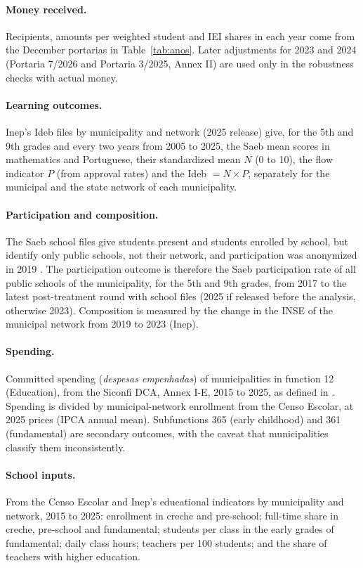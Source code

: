 \documentclass[11pt]{article}
\begin{document}
\paragraph{Money received.} Recipients, amounts per weighted student and IEI shares in each year come from the December portarias in Table~\ref{tab:anos}. Later adjustments for 2023 and 2024 (Portaria 7/2026 and Portaria 3/2025, Annex II) are used only in the robustness checks with actual money.

\paragraph{Learning outcomes.} Inep's Ideb files by municipality and network (2025 release) give, for the 5th and 9th grades and every two years from 2005 to 2025, the Saeb mean scores in mathematics and Portuguese, their standardized mean $N$ (0 to 10), the flow indicator $P$ (from approval rates) and the Ideb $= N \times P$, separately for the municipal and the state network of each municipality.

\paragraph{Participation and composition.} The Saeb school files give students present and students enrolled by school, but identify only public schools, not their network, and participation was anonymized in 2019 \citep{lima2025ideb}. The participation outcome is therefore the Saeb participation rate of all public schools of the municipality, for the 5th and 9th grades, from 2017 to the latest post-treatment round with school files (2025 if released before the analysis, otherwise 2023). Composition is measured by the change in the INSE of the municipal network from 2019 to 2023 (Inep).

\paragraph{Spending.} Committed spending (\textit{despesas empenhadas}) of municipalities in function 12 (Education), from the Siconfi DCA, Annex I-E, 2015 to 2025, as defined in \citet{cunha2026a}. Spending is divided by municipal-network enrollment from the Censo Escolar, at 2025 prices (IPCA annual mean). Subfunctions 365 (early childhood) and 361 (fundamental) are secondary outcomes, with the caveat that municipalities classify them inconsistently.

\paragraph{School inputs.} From the Censo Escolar and Inep's educational indicators by municipality and network, 2015 to 2025: enrollment in creche and pre-school; full-time share in creche, pre-school and fundamental; students per class in the early grades of fundamental; daily class hours; teachers per 100 students; and the share of teachers with higher education.
\end{document}
